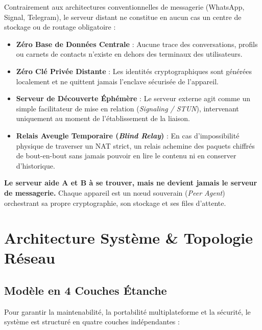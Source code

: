 \documentclass[11pt,a4paper]{article}
\begin{document}
Contrairement aux architectures conventionnelles de messagerie (WhatsApp, Signal, Telegram), le serveur distant ne constitue en aucun cas un centre de stockage ou de routage obligatoire :
\begin{itemize}[leftmargin=1.5cm]
    \item \textbf{Zéro Base de Données Centrale} : Aucune trace des conversations, profils ou carnets de contacts n'existe en dehors des terminaux des utilisateurs.
    \item \textbf{Zéro Clé Privée Distante} : Les identités cryptographiques sont générées localement et ne quittent jamais l'enclave sécurisée de l'appareil.
    \item \textbf{Serveur de Découverte Éphémère} : Le serveur externe agit comme un simple facilitateur de mise en relation (\textit{Signaling / STUN}), intervenant uniquement au moment de l'établissement de la liaison.
    \item \textbf{Relais Aveugle Temporaire (\textit{Blind Relay})} : En cas d'impossibilité physique de traverser un NAT strict, un relais achemine des paquets chiffrés de bout-en-bout sans jamais pouvoir en lire le contenu ni en conserver d'historique.
\end{itemize}

\begin{infobox}
\textbf{Le serveur aide A et B à se trouver, mais ne devient jamais le serveur de messagerie.} Chaque appareil est un nœud souverain (\textit{Peer Agent}) orchestrant sa propre cryptographie, son stockage et ses files d'attente.
\end{infobox}

\vspace{0.3cm}

\section{Architecture Système \& Topologie Réseau}

\subsection{Modèle en 4 Couches Étanche}
Pour garantir la maintenabilité, la portabilité multiplateforme et la sécurité, le système est structuré en quatre couches indépendantes :
\end{document}
